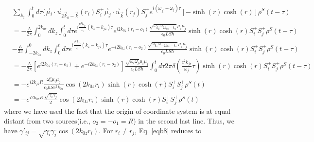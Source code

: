 \documentclass{article}
\begin{document}
\begin{equation}
\label{eqb9}\tag{A8}
\begin{split}
&\underset{k_{z}}{\sum}\int_{0}^{t}d\tau\{\vec{\mu}{}_{i}\cdot\vec{u}_{2\vec{k}_{0}-\vec{k}}(r_{i})S_{i}^{+}\vec{\mu}_{j}\cdot\vec{u}_{\vec{k}}(r_{j})S_{j}^{+}e^{i(\omega_{\vec{k}}-\omega_{j})\tau}[-\sinh(r)\cosh(r)]\rho^{S}(t-\tau)\\
&=-\frac{L}{2\pi}\int_{0}^{2k_{0z}}dk_{z}\int_{0}^{t}d\tau e^{i\frac{c^{2}k_{jz}}{_{\omega_{j}}}(k_{z}-k_{jz})\tau}e^{i2k_{0z}(r_{i}-o_{1})}\frac{\sqrt{\omega_{k_{z}}\omega_{2k_{0z}-k_{z}}}\mu_{i}\mu_{j}}{\epsilon_{0}LS\hbar}\sinh(r)\cosh(r)S_{i}^{+}S_{j}^{+}\rho^{S}(t-\tau)\\
&-\frac{L}{2\pi}\int_{-2k_{0z}}^{0}dk_{z}\int_{0}^{t}d\tau e^{i\frac{c^{2}k_{jz}}{_{\omega_{j}}}(k_{z}-k_{jz})\tau}e^{-i2k_{0z}(r_{i}-o_{2})}\frac{\sqrt{\omega_{k_{z}}\omega_{-2k_{0z}-k_{z}}}\mu_{i}\mu_{j}}{\epsilon_{0}LS\hbar}\sinh(r)\cosh(r)S_{i}^{+}S_{j}^{+}\rho^{S}(t-\tau)\\
&=-\frac{L}{2\pi}[e^{i2k_{0z}(r_{i}-o_{1})}+e^{-i2k_{0z}(r_{i}-o_{2})}]\frac{\sqrt{\omega_{i}\omega_{j}}\mu_{i}\mu_{j}}{\epsilon_{0}LS\hbar}\int_{0}^{t}d\tau2\pi\delta(\frac{c^{2}k_{jz}}{\omega_{j}}\tau)\sinh(r)\cosh(r)S_{i}^{+}S_{j}^{+}\rho^{S}(t-\tau)\\
&=-e^{i2k_{jz}R}\frac{\omega_{0}^{2}\mu_{i}\mu_{j}}{\epsilon_{0}\hbar Sc^{2}k_{0z}}\cos(2k_{0z}r_{i})\sinh(r)\cosh(r)S_{i}^{+}S_{j}^{+}\rho^{S}(t)\\
&=-e^{i2k_{0z}R}\frac{\sqrt{\gamma_{i}\gamma_{j}}}{2}\cos(2k_{0z}r_{i})\sinh(r)\cosh(r)S_{i}^{+}S_{j}^{+}\rho^{S}(t)
\end{split}
\end{equation}
where we have used the fact that the origin of coordinate system is at equal distant from two sources(i.e., $o_2=-o_1=R$) in the second last line. Thus, we have $\gamma'_{ij}=\sqrt{\gamma_{i}\gamma_{j}}\cos(2k_{0z}r_{i})$. For $r_i\neq r_j$, Eq. \eqref{eqb8} reduces to
\end{document}

